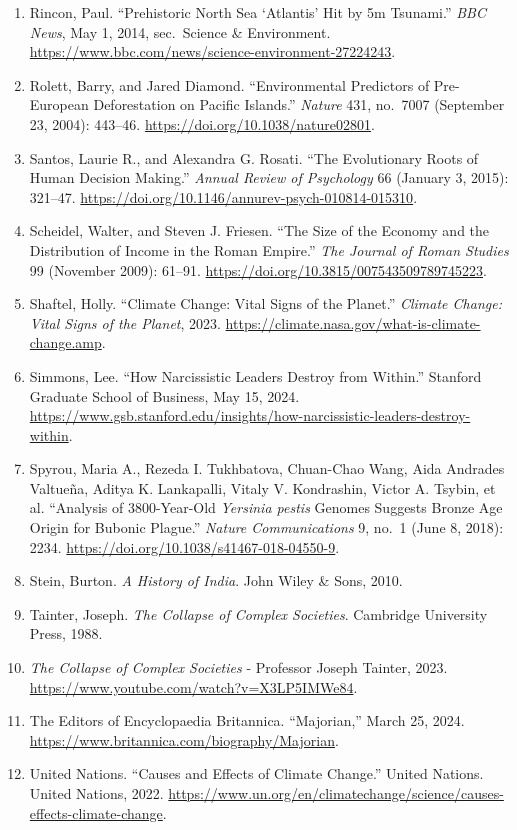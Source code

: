 \documentclass[12pt]{article}
\begin{document}
\begin{enumerate}[leftmargin=*]
\item Rincon, Paul. ``Prehistoric North Sea `Atlantis' Hit by 5m Tsunami.'' \textit{BBC News}, May 1, 2014, sec.\ Science \& Environment. \url{https://www.bbc.com/news/science-environment-27224243}.
\item Rolett, Barry, and Jared Diamond. ``Environmental Predictors of Pre-European Deforestation on Pacific Islands.'' \textit{Nature} 431, no.\ 7007 (September 23, 2004): 443--46. \url{https://doi.org/10.1038/nature02801}.
\item Santos, Laurie R., and Alexandra G. Rosati. ``The Evolutionary Roots of Human Decision Making.'' \textit{Annual Review of Psychology} 66 (January 3, 2015): 321--47. \url{https://doi.org/10.1146/annurev-psych-010814-015310}.
\item Scheidel, Walter, and Steven J. Friesen. ``The Size of the Economy and the Distribution of Income in the Roman Empire.'' \textit{The Journal of Roman Studies} 99 (November 2009): 61--91. \url{https://doi.org/10.3815/007543509789745223}.
\item Shaftel, Holly. ``Climate Change: Vital Signs of the Planet.'' \textit{Climate Change: Vital Signs of the Planet}, 2023. \url{https://climate.nasa.gov/what-is-climate-change.amp}.
\item Simmons, Lee. ``How Narcissistic Leaders Destroy from Within.'' Stanford Graduate School of Business, May 15, 2024. \url{https://www.gsb.stanford.edu/insights/how-narcissistic-leaders-destroy-within}.
\item Spyrou, Maria A., Rezeda I. Tukhbatova, Chuan-Chao Wang, Aida Andrades Valtueña, Aditya K. Lankapalli, Vitaly V. Kondrashin, Victor A. Tsybin, et al. ``Analysis of 3800-Year-Old \textit{Yersinia pestis} Genomes Suggests Bronze Age Origin for Bubonic Plague.'' \textit{Nature Communications} 9, no.\ 1 (June 8, 2018): 2234. \url{https://doi.org/10.1038/s41467-018-04550-9}.
\item Stein, Burton. \textit{A History of India}. John Wiley \& Sons, 2010.
\item Tainter, Joseph. \textit{The Collapse of Complex Societies}. Cambridge University Press, 1988.
\item \textit{The Collapse of Complex Societies} - Professor Joseph Tainter, 2023. \url{https://www.youtube.com/watch?v=X3LP5IMWe84}.
\item The Editors of Encyclopaedia Britannica. ``Majorian,'' March 25, 2024. \url{https://www.britannica.com/biography/Majorian}.
\item United Nations. ``Causes and Effects of Climate Change.'' United Nations. United Nations, 2022. \url{https://www.un.org/en/climatechange/science/causes-effects-climate-change}.

\end{enumerate}
\end{document}
